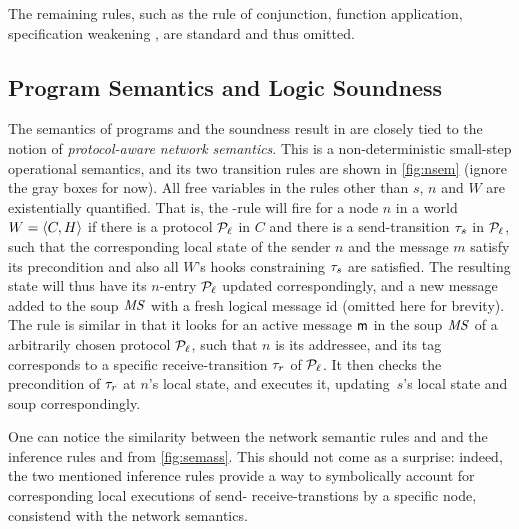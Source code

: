 The remaining rules, such as the rule of conjunction, function
application, specification weakening \etc, are standard and thus
omitted.



\subsection{Program Semantics and Logic Soundness}
\label{sec:soundness}


The semantics of programs and the soundness result in \disel are
closely tied to the notion of \emph{protocol-aware network semantics}.
%
This is a non-deterministic small-step operational semantics, and its
two transition rules are shown in \cref{fig:nsem} (ignore the
gray boxes for now).
%
All free variables in the rules other than $s$, $n$ and $W$ are
existentially quantified. That is, the -rule will
fire for a node $n$ in a world $W = \langle{C, H}\rangle$ if there is a
protocol $\mathcal{P}_\ell$ in $C$ and there is a send-transition $\tau_s$
in $\mathcal{P}_{\ell}$, such that the corresponding local state of the
sender $n$ and the message $m$ satisfy its precondition and also all
$W$'s hooks constraining $\tau_s$ are satisfied. The resulting state
will thus have its $n$-entry \wrt $\mathcal{P}_{\ell}$ updated
correspondingly, and a new message added to the soup $\mathit{MS}$ with a
fresh logical message id (omitted here for brevity).
%
The rule  is similar in that it looks for an active
message $\mathsf{m}$ in the soup $\mathit{MS}$ of a arbitrarily chosen protocol
$\mathcal{P}_{\ell}$, such that $n$ is its addressee, and its tag corresponds
to a specific receive-transition $\tau_r$ of $\mathcal{P}_{\ell}$. It then
checks the precondition of $\tau_r$ at $n$'s local state, and
executes it, updating~$s$'s local state and soup correspondingly.

One can notice the similarity between the network semantic rules
 and  and the inference rules
 and  from
\cref{fig:semass}. This should not come as a surprise: indeed, the
two mentioned inference rules provide a way to symbolically account
for corresponding local executions of send- receive-transtions by a
specific node, consistend with the network semantics.

